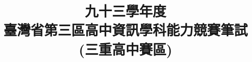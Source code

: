 \documentclass[12pt,a4paper]{report}
\begin{document}
\begin{CJK}{UTF8}{bkai}

\renewcommand{\figurename}{圖}
\renewcommand{\tablename}{表}
\renewcommand{\contentsname}{目~錄~}
\renewcommand{\listfigurename}{插~圖~目~錄}
\renewcommand{\listtablename}{表~格~目~錄}
\renewcommand{\appendixname}{附~錄}
\renewcommand{\bibname}{參~考~文~獻}     %
\renewcommand{\indexname}{索~引}
\renewcommand{\today}{\number\year~年~\number\month~月~\number\day~日}

\title{九十三學年度\\臺灣省第三區高中資訊學科能力競賽筆試\\(三重高中賽區)}
\date{}
\maketitle


\end{CJK}
\end{document}
